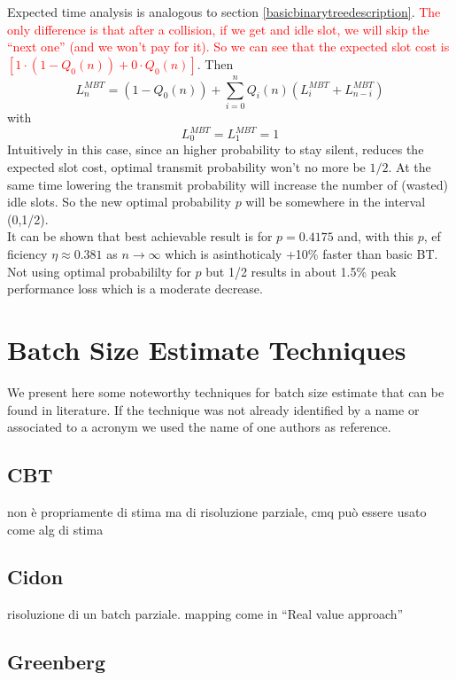 \documentclass[12pt,a4paper,twocolumns]{report}
\begin{document}
Expected time analysis is analogous  to section \ref{basicbinarytreedescription}. \textcolor{red}{The only difference is that after a collision, if we get and idle slot, we will skip the ``next one'' (and we won't pay for it). So we can see that the expected slot cost is $\left[1 \cdot (1-Q_{0}(n))+ 0\cdot Q_{0}(n)\right]$}. Then\\
\begin{equation}
L_{n}^{MBT} = \left(1 - Q_{0}(n)\right)+\sum_{i=0}^{n} Q_{i}(n) (L_{i}^{MBT}+L_{n-i}^{MBT})
\end{equation}
with
\begin{equation*}
L_{0}^{MBT} = L_{1}^{MBT}  = 1
\end{equation*}
Intuitively in this case, since an higher probability to stay silent, reduces the expected slot cost, optimal transmit probability won't no more be $1/2$. At the same time lowering the transmit probability will increase the number of (wasted) idle slots. So the new optimal probability $p$ will be somewhere in the interval (0,1/2).\\
It can be shown that best achievable result is for $p=0.4175$ and, with this $p$, ef ficiency $\eta \approx 0.381$ as $n \to \infty$ which is asinthoticaly +10\% faster than basic BT.
Not using optimal probabililty for $p$ but 1/2 results in about 1.5\% peak performance loss which is a moderate decrease.\\
\chapter{Batch Size Estimate Techniques}
We present here some noteworthy techniques for batch size estimate that can be found in literature.
If the technique was not already identified by a name or associated to a acronym we used the name of one authors as reference.
\section{CBT}
non è propriamente di stima ma di risoluzione parziale, cmq può essere usato come alg di stima 
\section{Cidon}
risoluzione di un batch parziale. mapping come in ``Real value approach''
\section{Greenberg}
\end{document}
